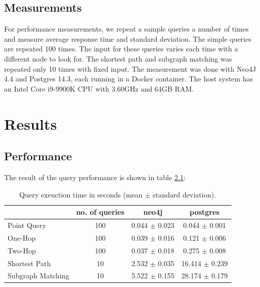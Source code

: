 \documentclass[11pt, a4paper,oneside,chapterprefix=false]{scrbook}
\begin{document}
\section{Measurements} \label{sec:measurements}

For performance measurements, we repeat a sample queries a number of times and measure average response time and standard deviation.
The simple queries are repeated 100 times.
The input for these queries varies each time with a different node to look for.
The shortest path and subgraph matching was repeated only 10 times with fixed input.
The measurement was done with Neo4J 4.4 and Postgres 14.3, each running in a Docker container.
The host system has an Intel Core i9-9900K CPU with 3.60GHz and 64GB RAM.

\chapter{Results} \label{chp:results}

\section{Performance} \label{sec:performance}

The result of the query performance is shown in table \ref{table:performance}:

\begin{table}
	\begin{center}
		\begin{tabular}{ |l|c|c|c| }
			\hline
			& no. of queries & neo4j & postgres \\
			\hline
			Point Query & 100 & 0.044 $\pm$ 0.023 & 0.044 $\pm$ 0.001 \\
			One-Hop & 100 & 0.039 $\pm$ 0.016 & 0.121 $\pm$ 0.006 \\
			Two-Hop & 100 & 0.037 $\pm$ 0.018 & 0.275 $\pm$ 0.008 \\
			Shortest Path & 10 & 2.532 $\pm$ 0.035 & 16.414 $\pm$ 0.239 \\
			Subgraph Matching & 10 & 5.522 $\pm$ 0.155 & 28.174 $\pm$ 0.179 \\
			\hline
		\end{tabular}
		\caption{\label{table:performance} Query exeuction time in seconds (mean $\pm$ standard deviation).}
	\end{center}
\end{table}
\end{document}

